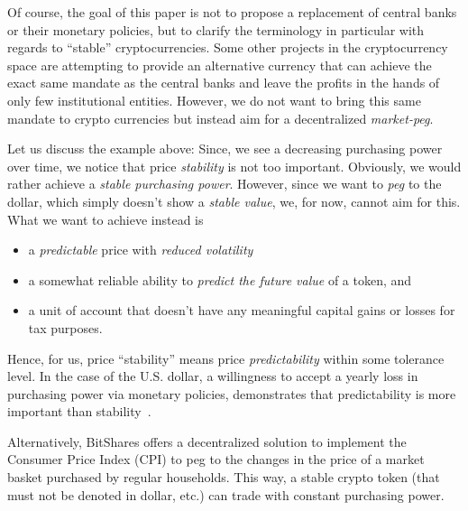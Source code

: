 Of course, the goal of this paper is not to propose a replacement of central
banks or their monetary policies, but to clarify the terminology in particular
with regards to ``stable'' cryptocurrencies. Some other projects in the
cryptocurrency space are attempting to provide an alternative currency that can
achieve the exact same mandate as the central banks and leave the profits in
the hands of only few institutional entities. However, we do not want to bring
this same mandate to crypto currencies but instead aim for a decentralized
\emph{market-peg}.

Let us discuss the example above: Since, we see a decreasing purchasing power
over time, we notice that price \emph{stability} is not too important.
Obviously, we would rather achieve a \emph{stable purchasing power}. However,
since we want to \emph{peg} to the dollar, which simply doesn't show a
\emph{stable value}, we, for now, cannot aim for this. What we want to achieve
instead is 
\begin{itemize}
 \item a \emph{predictable} price with \emph{reduced volatility}
 \item a somewhat reliable ability to \emph{predict the future value} of a token, and
 \item a unit of account that doesn't have any meaningful capital gains or
       losses for tax purposes.
\end{itemize}

Hence, for us, price ``stability'' means price \emph{predictability} within
some tolerance level. In the case of the U.S. dollar, a willingness to accept a
yearly loss in purchasing power via monetary policies, demonstrates that
predictability is more important than stability~\cite{bm:stable:impossible}.

Alternatively, BitShares offers a decentralized solution to implement the
Consumer Price Index (CPI) to peg to the changes in the price of a market
basket purchased by regular households. This way, a stable crypto token (that
must not be denoted in dollar, etc.) can trade with constant purchasing power.


%
%
%
